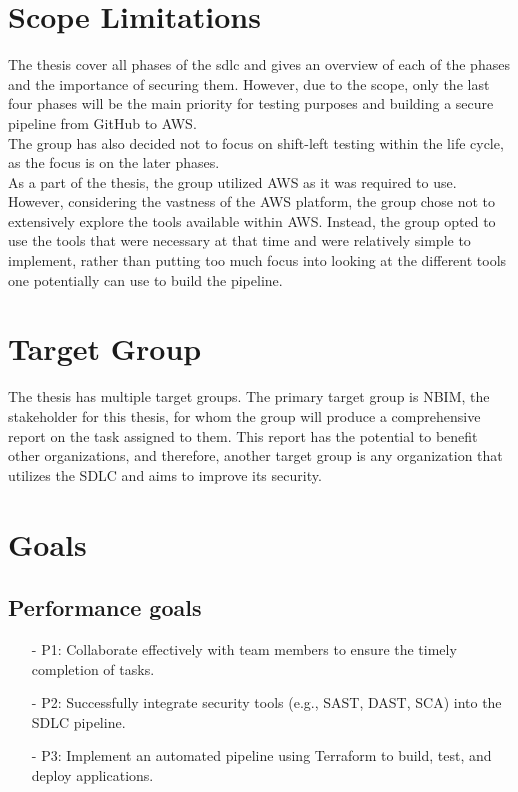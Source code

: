  
\section{Scope Limitations}
The thesis cover all phases of the \acrlong{sdlc} and gives an overview of each of the phases and the importance of securing them. However, due to the scope, only the last four phases will be the main priority for testing purposes and building a secure pipeline from GitHub to AWS.
\\
The group has also decided not to focus on \gls{shift-left} testing within the life cycle, as the focus is on the later phases. 
\\
As a part of the thesis, the group utilized AWS as it was required to use. However, considering the vastness of the AWS platform, the group chose not to extensively explore the tools available within AWS. Instead, the group opted to use the tools that were necessary at that time and were relatively simple to implement, rather than putting too much focus into looking at the different tools one potentially can use to build the pipeline.

\section{Target Group}
The thesis has multiple target groups. The primary target group is NBIM, the stakeholder for this thesis, for whom the group will produce a comprehensive report on the task assigned to them. This report has the potential to benefit other organizations, and therefore, another target group is any organization that utilizes the SDLC and aims to improve its security.
\newpage
\section{Goals}
\subsection{Performance goals}
\begin{itemize}
    \item[-] P1: Collaborate effectively with team members to ensure the timely completion of tasks. 
    
    \item[-] P2: Successfully integrate security tools (e.g., SAST, DAST, SCA) into the SDLC pipeline. 
    
    \item[-] P3: Implement an automated pipeline using Terraform to build, test, and deploy applications.
\end{itemize}

